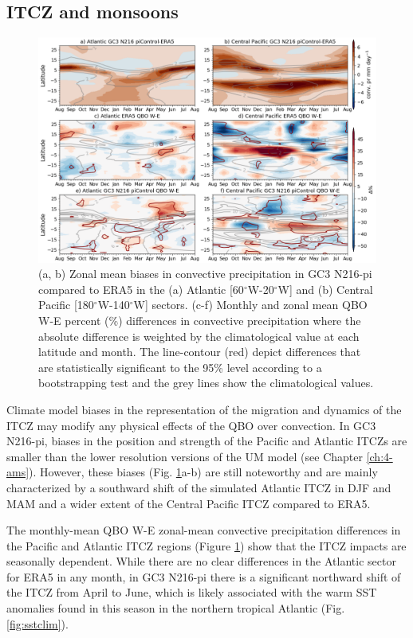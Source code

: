 \subsection{ITCZ and monsoons}

\begin{figure}[t!]
\centering
 \includegraphics[width=\linewidth]{figures/itcz_conv_prqbow.png}
\caption[Central Pacific ITCZ convective precipitation differences on QBO phase.]{ (a, b) Zonal mean biases in convective precipitation in GC3 N216-pi compared to ERA5 in the (a) Atlantic [60$^\circ$W-20$^\circ$W] and (b) Central Pacific [180$^\circ$W-140$^\circ$W] sectors. (c-f) Monthly and zonal mean QBO W-E percent (\%) differences in convective precipitation  where the absolute difference is weighted by the climatological value at each latitude and month. The line-contour (red) depict differences that are statistically significant to the 95\% level according to a bootstrapping test and the grey lines show the climatological values.}
\label{fig:itczqbowcp}
\end{figure}

Climate model biases in the representation of the migration and dynamics of the ITCZ may modify any physical effects of the QBO over convection. In GC3 N216-pi, biases in the position and strength of the Pacific and Atlantic ITCZs are smaller than the lower resolution versions of the UM model (see Chapter \ref{ch:4-ams}). 
However, these biases (Fig. \ref{fig:itczqbowcp}a-b) are still noteworthy and are mainly characterized by a southward shift of the simulated Atlantic ITCZ in DJF and MAM and a wider extent of the Central Pacific ITCZ compared to ERA5.


The monthly-mean QBO W-E zonal-mean convective precipitation differences in the Pacific and Atlantic ITCZ regions (Figure \ref{fig:itczqbowcp}) show that the ITCZ impacts are seasonally dependent.
While there are no clear differences in the Atlantic sector for ERA5 in any month, in GC3 N216-pi there is a significant northward shift of the ITCZ from April to June, which is likely associated with the warm SST anomalies found in this season in the northern tropical Atlantic (Fig. \ref{fig:sstclim}). 

